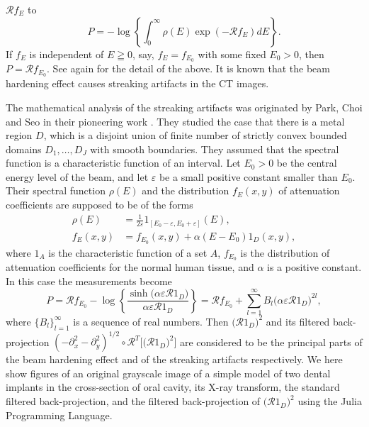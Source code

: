 \documentclass[a4paper,11pt,reqno]{amsart}
\numberwithin{equation}{section}
\theoremstyle{definition}
\theoremstyle{remark}
\begin{document}
$\mathcal{R}f_E$ to 
%
%
$$
P=-\operatorname{log}\left\{\int_0^\infty\rho(E)\exp(-\mathcal{R}f_E)dE\right\}. 
$$
%
%
If $f_E$ is independent of $E\geqq0$, say, $f_E=f_{E_0}$ with some fixed $E_0>0$, 
then $P=\mathcal{R}f_{E_0}$. See \cite[Section~3.3]{Epstein} again for the detail of the above. 
It is known that the beam hardening effect causes streaking artifacts in the CT images. 
%
%
\par
%
%
The mathematical analysis of the streaking artifacts was originated 
by Park, Choi and Seo in their pioneering work \cite{ParkChoiSeo}. 
They studied the case that there is a metal region $D$, 
which is a disjoint union of finite number of strictly convex bounded domains 
$D_1,\dotsc,D_J$ with smooth boundaries. 
They assumed that the spectral function is a characteristic function of an interval. 
Let $E_0>0$ be the central energy level of the beam, 
and let $\varepsilon$ be a small positive constant smaller than $E_0$. 
Their spectral function $\rho(E)$ and the distribution $f_E(x,y)$ of attenuation coefficients 
are supposed to be of the forms   
%
%
\begin{align*}
  \rho(E)
& =
  \frac{1}{2\varepsilon}1_{[E_0-\varepsilon,E_0+\varepsilon]}(E),
\\
  f_E(x,y)
& =
  f_{E_0}(x,y)
  +
  \alpha(E-E_0)1_D(x,y),
\end{align*} 
%
%
where $1_A$ is the characteristic function of a set $A$, 
$f_{E_0}$ is the distribution of attenuation coefficients for the normal human tissue, 
and $\alpha$ is a positive constant. In this case the measurements become 
%
%
$$
P
=
\mathcal{R}f_{E_0}
-
\log\left\{\frac{\sinh\bigl(\alpha\varepsilon\mathcal{R}1_D\bigr)}{\alpha\varepsilon\mathcal{R}1_D}\right\}
=
\mathcal{R}f_{E_0}
+
\sum_{l=1}^\infty
B_l\bigl(\alpha\varepsilon\mathcal{R}1_D\bigr)^{2l}, 
$$
%
%
where $\{B_l\}_{l=1}^\infty$ is a sequence of real numbers. 
Then $\bigl(\mathcal{R}1_D\bigr)^2$ and its filtered back-projection 
$(-\partial_x^2-\partial_y^2)^{1/2}\circ\mathcal{R}^T\bigl[\bigl(\mathcal{R}1_D\bigr)^2\bigr]$ 
are considered to be the principal parts of the beam hardening effect and of the streaking artifacts respectively. 
We here show figures of an original grayscale image of a simple model of two dental implants in the cross-section of oral cavity, 
its X-ray transform, the standard filtered back-projection, and the filtered back-projection of $\bigl(\mathcal{R}1_D\bigr)^2$ using the Julia Programming Language. 
%
%
\vspace{11pt}
\\
%
\end{document}

